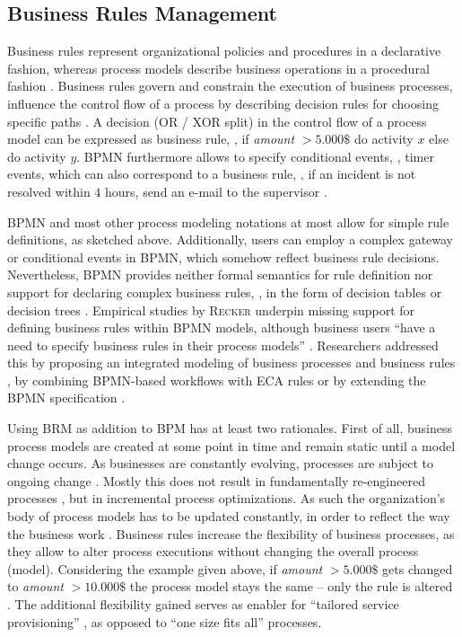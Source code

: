 \subsection{Business Rules Management} \label{sec:ECA}

Business rules represent organizational policies and procedures in a declarative fashion, whereas process models describe business operations in a procedural fashion \citep[]{Muehlen2008}. Business rules govern and constrain the execution of business processes, \ie influence the control flow of a process by describing decision rules for choosing specific paths \citep[]{Recker2010}. A decision (OR / XOR split) in the control flow of a process model can be expressed as business rule, \eg, if \textit{amount} $ > 5.000 \$ $ do activity $x$ else do activity $y$. \ac{BPMN} furthermore allows to specify conditional events, \ie, timer events, which can also correspond to a business rule, \eg, if an incident is not resolved within $4$ hours, send an e-mail to the supervisor \citep[]{Dumas2013}. 

\ac{BPMN} and most other process modeling notations at most allow for simple rule definitions, as sketched above. Additionally, users can employ a complex gateway or conditional events in \ac{BPMN}, which somehow reflect business rule decisions. Nevertheless, \ac{BPMN} provides neither formal semantics for rule definition nor support for declaring complex business rules, \eg, in the form of decision tables or decision trees \citep[]{Muehlen2008}. Empirical studies by \textsc{Recker} underpin missing support for defining business rules within \ac{BPMN} models, although business users \enquote{have a need to specify business rules in their process models} \citep[]{Recker2010}. Researchers addressed this by proposing an integrated modeling of business processes and business rules \citep[\cf][]{Muehlen2008}, by combining \ac{BPMN}-based workflows with \ac{ECA} rules \citep[\cf][]{Dohring2011} or by extending the \ac{BPMN} specification \citep[\cf][]{Krumeich2014}. 

Using \ac{BRM} as addition to \ac{BPM} has at least two rationales. First of all, business process models are created at some point in time and remain static until a model change occurs. As businesses are constantly evolving, processes are subject to ongoing change \citep[][]{Bry2006}. Mostly this does not result in fundamentally re-engineered processes \citep{Davenport1993}, but in incremental process optimizations. As such the organization's body of process models has to be updated constantly, in order to reflect the way the business work \citep[]{Bry2006}. Business rules increase the flexibility of business processes, as they allow to alter process executions without changing the overall process (model). Considering the example given above, if \textit{amount} $> 5.000 \$ $ gets changed to \textit{amount} $> 10.000 \$ $ the process model stays the same -- only the rule is altered \citep[]{Gong2009}. The additional flexibility gained serves as enabler for \enquote{tailored service provisioning} \citep[]{Gong2009}, as opposed to \enquote{one size fits all} processes. 

